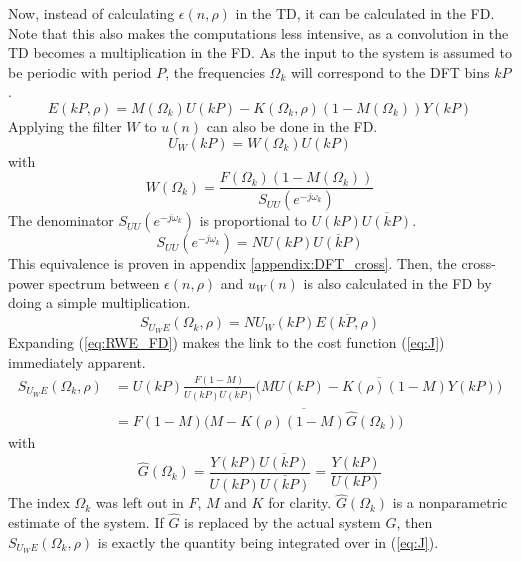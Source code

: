 Now, instead of calculating $\epsilon(n,\rho)$ in the TD, it can be calculated in the FD. Note that this also makes the computations less intensive, as a convolution in the TD becomes a multiplication in the FD. As the input to the system is assumed to be periodic  with period $P$, the frequencies $\Omega_k$ will correspond to the DFT bins $kP$.
\begin{equation*}
    E(kP,\rho) = M(\Omega_k) U(kP) - K(\Omega_k,\rho) (1-M(\Omega_k)) Y(kP)
\end{equation*}
Applying the filter $W$ to $u(n)$ can also be done in the FD.
\begin{equation*}
    U_W(kP) = W(\Omega_k) U(kP)
\end{equation*}
with
\begin{equation*}
    W(\Omega_k) = \frac{F(\Omega_k)(1-M(\Omega_k))}{S_{UU}(e^{-j \omega_k})}
\end{equation*}
The denominator $S_{UU}(e^{-j \omega_k})$ is proportional to $U(kP)\overline{U(kP)}$.
\begin{equation}
S_{UU}(e^{-j \omega_k}) = N U(kP)\overline{U(kP)}
\label{eq:Suu=NUU}
\end{equation}
This equivalence is proven in appendix \ref{appendix:DFT_cross}. Then, the cross-power spectrum between $\epsilon(n,\rho)$ and $u_W(n)$ is also calculated in the FD by doing a simple multiplication.
\begin{equation}
    S_{U_W\!E}(\Omega_k,\rho) = N U_W(kP) \overline{E(kP,\rho)}
    \label{eq:RWE_FD}
\end{equation}
Expanding (\ref{eq:RWE_FD}) makes the link to the cost function (\ref{eq:J}) immediately apparent.
\begin{align}
    S_{U_W\!E}(\Omega_k,\rho) &= U(kP) \frac{F(1-M)}{U(kP)\overline{U(kP)}}  \overline{ \big(M U(kP) - K(\rho) (1-M) Y(kP) \big)} \label{eq:PhiUwepsilon_FD}\\
    &= F (1-M) \overline{\big( M - K(\rho) (1-M)\hat{G}(\Omega_k) \big)}
    \label{eq:cross-power_in_FD}
\end{align}
with 
\begin{equation}
    \hat{G}(\Omega_k) = \frac{Y(kP) \overline{U(kP)}}{U(kP) \overline{U(kP)}} = \frac{Y(kP)}{U(kP)}
    \label{eq:Ghat=YU/UU}
\end{equation}
The index $\Omega_k$ was left out in $F$, $M$ and $K$ for clarity.
$\hat{G}(\Omega_k)$ is a nonparametric estimate of the system. If $\hat{G}$ is replaced by the actual system $G$, then $S_{U_W\!E}(\Omega_k,\rho)$ is exactly the quantity being integrated over in (\ref{eq:J}).

